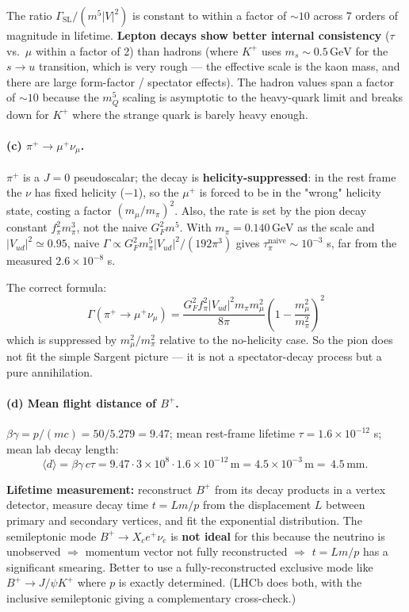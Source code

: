 \documentclass[11pt]{article}
\newcommand{\GeV}{\,\mathrm{GeV}}
\begin{document}
The ratio $\Gamma_\mathrm{SL}/(m^{5}|V|^{2})$ is constant to within a factor of $\sim 10$ across 7 orders of magnitude in lifetime. \textbf{Lepton decays show better internal consistency} ($\tau$ vs.\ $\mu$ within a factor of 2) than hadrons (where $K^+$ uses $m_s\sim 0.5\GeV$ for the $s\to u$ transition, which is very rough --- the effective scale is the kaon mass, and there are large form-factor / spectator effects). The hadron values span a factor of $\sim 10$ because the $m_Q^{5}$ scaling is asymptotic to the heavy-quark limit and breaks down for $K^+$ where the strange quark is barely heavy enough.

\paragraph{(c) $\pi^+\to\mu^+\nu_\mu$.} $\pi^+$ is a $J=0$ pseudoscalar; the decay is \textbf{helicity-suppressed}: in the rest frame the $\nu$ has fixed helicity ($-1$), so the $\mu^+$ is forced to be in the "wrong" helicity state, costing a factor $(m_\mu/m_\pi)^{2}$. Also, the rate is set by the pion decay constant $f_\pi^{2}m_\pi^{3}$, not the naive $G_F^{2}m^{5}$. With $m_\pi=0.140\GeV$ as the scale and $|V_{ud}|^{2}\simeq 0.95$, naive $\Gamma\propto G_F^{2}m_\pi^{5}|V_{ud}|^{2}/(192\pi^{3})$ gives $\tau_\pi^\mathrm{naive}\sim 10^{-3}$ s, far from the measured $2.6\times 10^{-8}$ s.

The correct formula:
\[
\Gamma(\pi^+\to\mu^+\nu_\mu)=\frac{G_F^{2}f_\pi^{2}|V_{ud}|^{2}m_\pi m_\mu^{2}}{8\pi}\!\left(1-\frac{m_\mu^{2}}{m_\pi^{2}}\right)^{2}
\]
which is suppressed by $m_\mu^{2}/m_\pi^{2}$ relative to the no-helicity case. So the pion does not fit the simple Sargent picture --- it is not a spectator-decay process but a pure annihilation.

\paragraph{(d) Mean flight distance of $B^+$.} $\beta\gamma=p/(mc)=50/5.279=9.47$; mean rest-frame lifetime $\tau=1.6\times 10^{-12}$ s; mean lab decay length:
\[
\langle d\rangle=\beta\gamma\,c\tau=9.47\cdot 3\times 10^{8}\cdot 1.6\times 10^{-12}\,\mathrm{m}=4.5\times 10^{-3}\,\mathrm{m}=\boxed{\,4.5\,\mathrm{mm}.\,}
\]

\textbf{Lifetime measurement:} reconstruct $B^+$ from its decay products in a vertex detector, measure decay time $t=L m/p$ from the displacement $L$ between primary and secondary vertices, and fit the exponential distribution. The semileptonic mode $B^+\to X_c e^+\nu_e$ is \textbf{not ideal} for this because the neutrino is unobserved $\Rightarrow$ momentum vector not fully reconstructed $\Rightarrow$ $t=L m/p$ has a significant smearing. Better to use a fully-reconstructed exclusive mode like $B^+\to J/\psi K^+$ where $p$ is exactly determined. (LHCb does both, with the inclusive semileptonic giving a complementary cross-check.)
\end{document}

